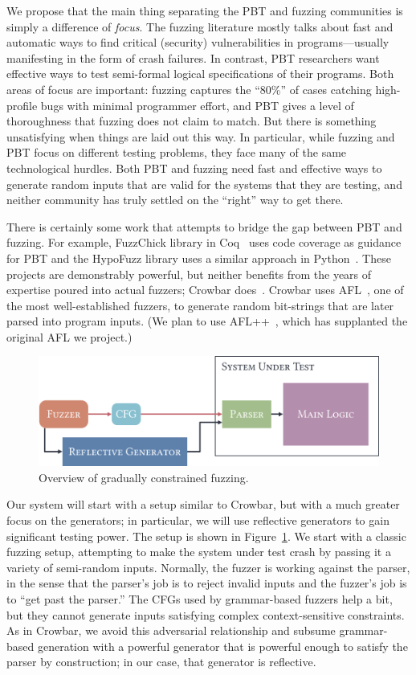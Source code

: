 We propose that the main thing separating the PBT and fuzzing communities is
simply a difference of {\em focus}. The fuzzing literature mostly talks about
fast and automatic ways to find critical (security) vulnerabilities in
programs---usually manifesting in the form of crash failures.  In contrast, PBT
researchers want effective ways to test semi-formal logical specifications of
their programs. Both areas of focus are important: fuzzing captures the ``80\%''
of cases catching high-profile bugs with minimal programmer effort, and PBT
gives a level of thoroughness that fuzzing does not claim to match. But there is
something unsatisfying when things are laid out this way. In particular, while
fuzzing and PBT focus on different testing problems, they face many of the same
technological hurdles. Both PBT and fuzzing need fast and effective ways to
generate random inputs that are valid for the systems that they are testing, and
neither community has truly settled on the ``right'' way to get there.

There is certainly some work that attempts to bridge the gap between PBT and
fuzzing. For example, FuzzChick library in Coq~\cite{OLDlampropoulos19fuzzchick}
uses code coverage as guidance for PBT and the HypoFuzz library uses a
similar approach in Python~\cite{hatfield-dodds_hypofuzz_nodate}. These projects
are demonstrably powerful, but neither benefits from the years of expertise
poured into actual fuzzers; Crowbar does~\cite{dolan2017testing}. Crowbar uses
AFL~\cite{afl-readme}, one of the most well-established
fuzzers, to generate random bit-strings that are later parsed into program
inputs.  (We plan to use AFL++~\cite{fioraldi_afl_2020},
which has supplanted the original AFL we project.)

\begin{figure}
  \centering
  \includegraphics[width=.4\textwidth]{assets/fuzzing.pdf}
  \caption{Overview of gradually constrained fuzzing.}\label{fig:fuzzing-plan}
\end{figure}

Our system will start with a setup similar to Crowbar, but with a much greater
focus on the generators; in particular, we will use reflective generators to
gain significant testing power. The setup is shown in
Figure~\ref{fig:fuzzing-plan}. We start with a classic fuzzing setup, attempting
to make the system under test crash by passing it a variety of semi-random
inputs. Normally, the fuzzer is working against the parser, in the sense that
the parser's job is to reject invalid inputs and the fuzzer's job is to ``get
past the parser.'' The CFGs used by grammar-based fuzzers help a bit, but they
cannot generate inputs satisfying complex context-sensitive constraints. As in
Crowbar, we avoid this adversarial relationship and subsume grammar-based
generation with a powerful generator that is powerful enough to satisfy the
parser by construction; in our case, that generator is reflective.

